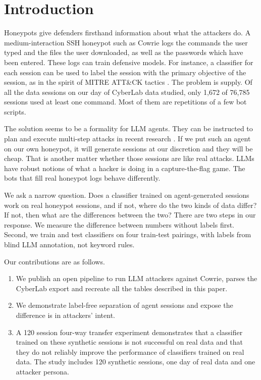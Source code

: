 \documentclass[runningheads]{llncs}
\begin{document}
\section{Introduction}

Honeypots give defenders firsthand information about what the attackers do. A medium-interaction SSH honeypot such as Cowrie \cite{oosterhof2015cowrie} logs the commands the user typed and the files the user downloaded, as well as the passwords which have been entered. These logs can train defensive models. For instance, a classifier for each session can be used to label the session with the primary objective of the session, as in the spirit of MITRE ATT\&CK tactics \cite{strom2018attack}. The problem is supply. Of all the data sessions on our day of CyberLab data \cite{sedlar2020cyberlab} studied, only 1,672 of 76,785 sessions used at least one command. Most of them are repetitions of a few bot scripts.

The solution seems to be a formality for LLM agents. They can be instructed to plan and execute multi-step attacks in recent research \cite{deng2024pentestgpt,fang2024hack}. If we put such an agent on our own honeypot, it will generate sessions at our discretion and they will be cheap. That is another matter whether those sessions are like real attacks. LLMs have robust notions of what a hacker is doing in a capture-the-flag game. The bots that fill real honeypot logs behave differently.

We ask a narrow question. Does a classifier trained on agent-generated sessions work on real honeypot sessions, and if not, where do the two kinds of data differ? If not, then what are the differences between the two? There are two steps in our response. We measure the difference between numbers without labels first. Second, we train and test classifiers on four train-test pairings, with labels from blind LLM annotation, not keyword rules.

Our contributions are as follows.
\begin{enumerate}
\renewcommand{\labelenumi}{\arabic{enumi})}
\item We publish an open pipeline to run LLM attackers against Cowrie, parses the CyberLab export and recreate all the tables described in this paper.
\item We demonstrate label-free separation of agent sessions and expose the difference is in attackers' intent.
\item A 120 session four-way transfer experiment demonstrates that a classifier trained on these synthetic sessions is not successful on real data and that they do not reliably improve the performance of classifiers trained on real data. The study includes 120 synthetic sessions, one day of real data and one attacker persona.
\end{enumerate}
\end{document}
